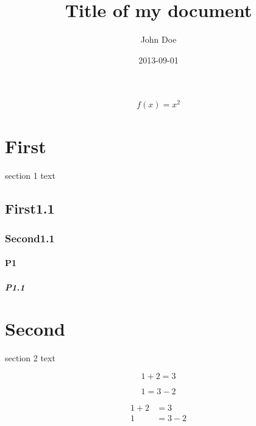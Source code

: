 \documentclass{article}
\title{Title of my document}
\date{2013-09-01}
\author{John Doe}
\begin{document}
\maketitle
{}
\newpage
{}
\begin{equation*}
  f(x) = x^2
\end{equation*}


\section{First}
section 1 text 
\subsection{First1.1}
\subsubsection{Second1.1}

\paragraph{P1}
\subparagraph{P1.1}

\newpage
\section{Second}
section 2 text 


\begin{equation*}
  1 + 2 = 3 
\end{equation*}

\begin{equation*}
  1 = 3 - 2
\end{equation*}

\begin{align*}
  1 + 2 &= 3\\
  1 &= 3 - 2
\end{align*}
\end{document}

